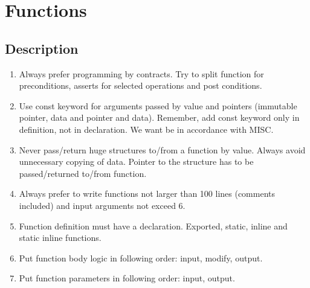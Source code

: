 \section{Functions}
\subsection{Description}
\begin{enumerate}
    \item Always prefer programming by contracts. Try to split function for preconditions, asserts for selected operations and post conditions.
    \item Use const keyword for arguments passed by value and pointers (immutable pointer, data and pointer and data). Remember, add const keyword only in definition, not in declaration. We want be in accordance with MISC.
    \item Never pass/return huge structures to/from a function by value. Always avoid unnecessary copying of data. Pointer to the structure has to be passed/returned to/from function.
    \item Always prefer to write functions not larger than 100 lines (comments included) and input arguments not exceed 6. 
    \item Function definition must have a declaration. Exported, static, inline and static inline functions.
    \item Put function body logic in following order: input, modify, output.
    \item Put function parameters in following order: input, output.
\end{enumerate}


